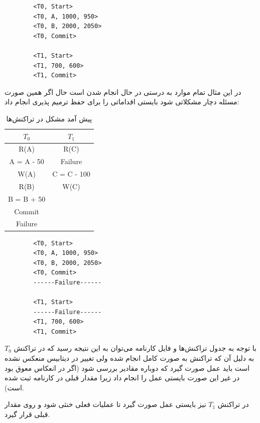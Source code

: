 \begin{LTR}
    \begin{lstlisting}
        <T0, Start>
        <T0, A, 1000, 950>
        <T0, B, 2000, 2050>
        <T0, Commit>
        
        <T1, Start>
        <T1, 700, 600>
        <T1, Commit>
    \end{lstlisting}
\end{LTR}

در این مثال تمام موارد به درستی در حال انجام شدن است حال اگر همین صورت مسئله
دچار مشکلاتی شود بایستی اقداماتی را برای حفظ ترمیم پذیری انجام داد:

\begin{LTR}
    \begin{table}[h]
        \centering
        \begin{RTL}
            \caption{پیش آمد مشکل در تراکنش‌ها}
        \end{RTL}
        \begin{tabular}{c|c}
            $T_0$ & $T_1$ \\ \hline
            R(A) & R(C) \\
            A = A - 50 & Failure \\
            W(A) & C = C - 100 \\
            R(B) & W(C) \\
            B = B + 50 &  \\
            Commit & \\
            Failure & \\
        \end{tabular}
    \end{table}
\end{LTR}

\begin{LTR}
    \begin{lstlisting}
        <T0, Start>
        <T0, A, 1000, 950>
        <T0, B, 2000, 2050>
        <T0, Commit>
        ------Failure------
        
        <T1, Start>
        ------Failure------
        <T1, 700, 600>
        <T1, Commit>
    \end{lstlisting}
\end{LTR}

با توجه به جدول تراکنش‌ها و فایل کارنامه می‌توان به این نتیجه رسید که در تراکنش
$T_0$ به دلیل آن که تراکنش به صورت کامل انجام شده ولی تغییر در دیتابیس منعکس
نشده است باید عمل  صورت گیرد که دوباره مقادیر بررسی شود (اگر در انعکاس
معوق بود در غیر این صورت بایستی عمل  را انجام داد زیرا مقدار قبلی در
کارنامه ثبت شده است).

در تراکنش $T_1$ نیز بایستی عمل  صورت گیرد تا عملیات فعلی خنثی شود و روی
مقدار قبلی قرار گیرد.